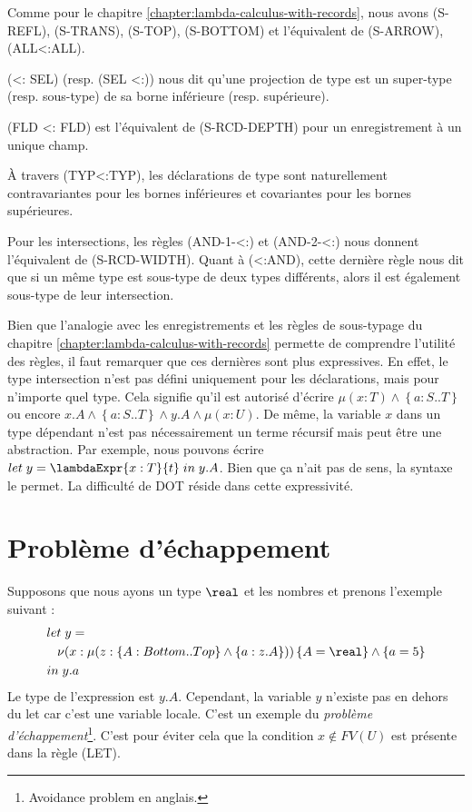 Comme pour le chapitre \ref{chapter:lambda-calculus-with-records}, nous
avons (S-REFL), (S-TRANS), (S-TOP), (S-BOTTOM) et l'équivalent de (S-ARROW), (ALL<:ALL).

(<: SEL) (resp. (SEL <:)) nous dit qu'une projection de type est un super-type (resp.
sous-type) de sa borne inférieure (resp. supérieure).

(FLD <: FLD) est l'équivalent de (S-RCD-DEPTH) pour un enregistrement à un
unique champ.

À travers (TYP<:TYP), les déclarations de type sont naturellement contravariantes
pour les bornes inférieures et covariantes pour les bornes supérieures.

Pour les intersections, les règles (AND-1-<:) et (AND-2-<:) nous donnent
l'équivalent de (S-RCD-WIDTH). Quant à (<:AND), cette dernière règle nous dit
que si un même type est sous-type de deux types différents, alors il est
également sous-type de leur intersection.

Bien que l'analogie avec les enregistrements et les règles de sous-typage du
chapitre \ref{chapter:lambda-calculus-with-records} permette de comprendre
l'utilité des règles, il faut remarquer que ces dernières sont plus expressives. En
effet, le type intersection n'est pas défini uniquement pour les déclarations,
mais pour n'importe quel type. Cela signifie qu'il est autorisé d'écrire $\mu(x
: T) \wedge \left\{ a : S .. T \right\}$ ou encore $x.A \wedge \left\{ a : S ..
  T \right\} \wedge y.A \wedge \mu(x : U)$.
De même, la variable $x$ dans un type dépendant n'est pas nécessairement un
terme récursif mais peut être une abstraction. Par exemple, nous pouvons écrire
$let \; y = \lambdaExpr{x : T}{t} \; in \; y.A$. Bien que ça n'ait pas de sens, la
syntaxe le permet.
La difficulté de DOT réside dans cette expressivité.

\section{Problème d'échappement}

Supposons que nous ayons un type $\real$ et les nombres et prenons l'exemple suivant :
\begin{align*}
  & let \; y = \\
  &\; \; \; \nu(x : \mu(z : \left\{ A : Bottom .. Top \right\} \wedge \left\{ a : z.A \right\})) \left\{ A = \real \right\} \wedge \left\{ a = 5 \right\} \\
  & in \; y.a
\end{align*}
Le type de l'expression est $y.A$. Cependant, la variable $y$ n'existe pas en
dehors du let car c'est une variable locale. C'est un exemple du
\textit{problème d'échappement}\footnote{\og Avoidance problem \fg \; en
anglais.}. C'est pour éviter cela que la condition $x \notin
FV(U)$ est présente dans la règle (LET).

